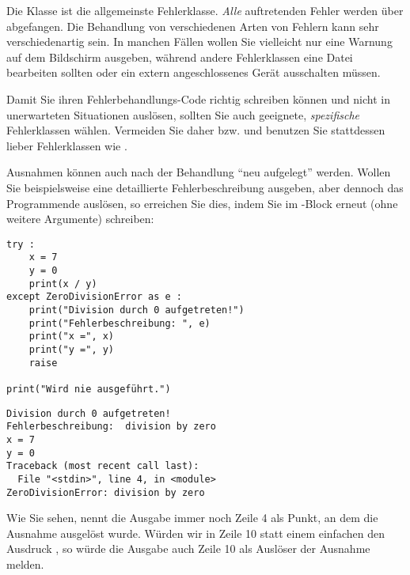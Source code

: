 \begin{hintbox}
Die Klasse  ist die allgemeinste Fehlerklasse. \emph{Alle} auftretenden Fehler werden über  abgefangen. Die Behandlung von verschiedenen Arten von Fehlern kann sehr verschiedenartig sein. In manchen Fällen wollen Sie vielleicht nur eine Warnung auf dem Bildschirm ausgeben, während andere Fehlerklassen eine Datei bearbeiten sollten oder ein extern angeschlossenes Gerät ausschalten müssen.

Damit Sie ihren Fehlerbehandlungs-Code richtig schreiben können und nicht in unerwarteten Situationen auslösen, sollten Sie auch geeignete, \emph{spezifische} Fehlerklassen wählen. Vermeiden Sie daher  bzw.  und benutzen Sie stattdessen lieber Fehlerklassen wie .
\end{hintbox}

Ausnahmen können auch nach der Behandlung \enquote{neu aufgelegt} werden. Wollen Sie beispielsweise eine detaillierte Fehlerbeschreibung ausgeben, aber dennoch das Programmende auslösen, so erreichen Sie dies, indem Sie im -Block erneut  (ohne weitere Argumente) schreiben:

\begin{codebox}
\begin{verbatim}
try :
    x = 7
    y = 0
    print(x / y)
except ZeroDivisionError as e :
    print("Division durch 0 aufgetreten!")
    print("Fehlerbeschreibung: ", e)
    print("x =", x)
    print("y =", y)
    raise

print("Wird nie ausgeführt.")
\end{verbatim}
\end{codebox}

\begin{cmdbox}
\begin{verbatim}
Division durch 0 aufgetreten!
Fehlerbeschreibung:  division by zero
x = 7
y = 0
Traceback (most recent call last):
  File "<stdin>", line 4, in <module>
ZeroDivisionError: division by zero

\end{verbatim}
\end{cmdbox}

Wie Sie sehen, nennt die Ausgabe immer noch Zeile 4 als Punkt, an dem die Ausnahme ausgelöst wurde. Würden wir in Zeile 10 statt einem einfachen  den Ausdruck , so würde die Ausgabe auch Zeile 10 als Auslöser der Ausnahme melden.


